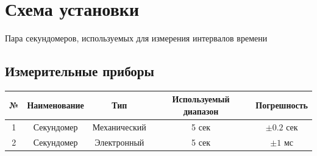 \documentclass[12pt,a4paper]{article}
\begin{document}
\section{Схема установки}
Пара секундомеров, используемых для измерения интервалов времени
\subsection{Измерительные приборы}
\hfill\break
\begin{tabular}{|c|c|c|c|c|}
    \hline
    № & Наименование & Тип & Используемый диапазон & Погрешность \\
    \hline
    1 & Секундомер & Механический & 5 сек & $\pm 0.2$ сек \\
    \hline
    2 & Секундомер & Электронный & 5 сек & $\pm 1$ мс \\
    \hline
\end{tabular}
\end{document}

